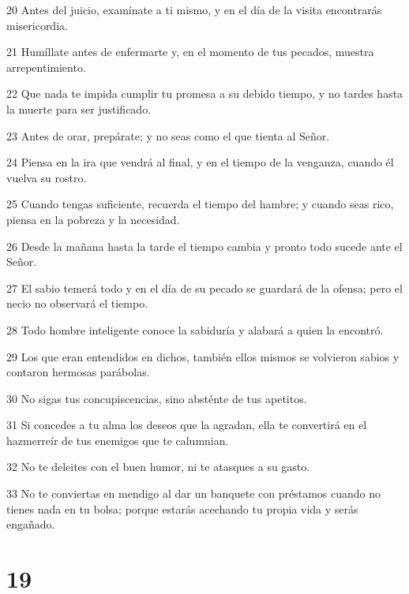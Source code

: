 \par 20 Antes del juicio, examínate a ti mismo, y en el día de la visita encontrarás misericordia.
\par 21 Humíllate antes de enfermarte y, en el momento de tus pecados, muestra arrepentimiento.
\par 22 Que nada te impida cumplir tu promesa a su debido tiempo, y no tardes hasta la muerte para ser justificado.
\par 23 Antes de orar, prepárate; y no seas como el que tienta al Señor.
\par 24 Piensa en la ira que vendrá al final, y en el tiempo de la venganza, cuando él vuelva su rostro.
\par 25 Cuando tengas suficiente, recuerda el tiempo del hambre; y cuando seas rico, piensa en la pobreza y la necesidad.
\par 26 Desde la mañana hasta la tarde el tiempo cambia y pronto todo sucede ante el Señor.
\par 27 El sabio temerá todo y en el día de su pecado se guardará de la ofensa; pero el necio no observará el tiempo.
\par 28 Todo hombre inteligente conoce la sabiduría y alabará a quien la encontró.
\par 29 Los que eran entendidos en dichos, también ellos mismos se volvieron sabios y contaron hermosas parábolas.
\par 30 No sigas tus concupiscencias, sino absténte de tus apetitos.
\par 31 Si concedes a tu alma los deseos que la agradan, ella te convertirá en el hazmerreír de tus enemigos que te calumnian.
\par 32 No te deleites con el buen humor, ni te atasques a su gasto.
\par 33 No te conviertas en mendigo al dar un banquete con préstamos cuando no tienes nada en tu bolsa; porque estarás acechando tu propia vida y serás engañado.

\chapter{19}

